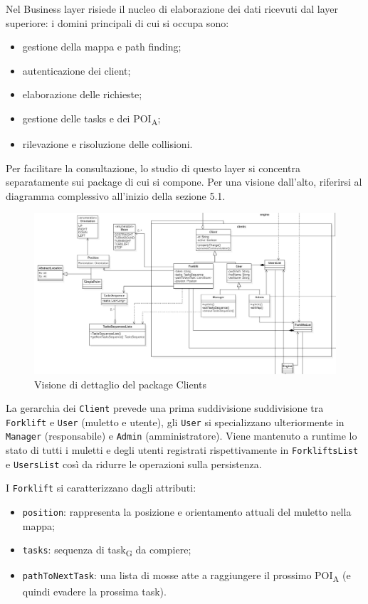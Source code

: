 Nel Business layer risiede il nucleo di elaborazione dei dati ricevuti dal layer superiore: i domini principali di cui si occupa sono:
\begin{itemize}
	\item gestione della mappa e path finding;
	\item autenticazione dei client;
    \item elaborazione delle richieste;
	\item gestione delle tasks e dei POI\textsubscript{A};
	\item rilevazione e risoluzione delle collisioni.
\end{itemize}
Per facilitare la consultazione, lo studio di questo layer si concentra separatamente sui package di cui si compone. Per una visione dall'alto, riferirsi al diagramma complessivo all'inizio della sezione 5.1.



\clearpage
{}

\begin{figure}[H]
	\centering
	\includegraphics[scale=0.40]{res/diagrams/server/server_pack_clients.jpg}
	\caption{Visione di dettaglio del package Clients}
\end{figure}

La gerarchia dei \texttt{Client} prevede una prima suddivisione suddivisione tra \texttt{Forklift} e \texttt{User} (muletto e utente), gli \texttt{User} si specializzano ulteriormente in \texttt{Manager} (responsabile) e \texttt{Admin} (amministratore). Viene mantenuto a runtime lo stato di tutti i muletti e degli utenti registrati rispettivamente in \texttt{ForkliftsList} e \texttt{UsersList} così da ridurre le operazioni sulla persistenza.

I \texttt{Forklift} si caratterizzano dagli attributi:
\begin{itemize}
	\item \texttt{position}: rappresenta la posizione e orientamento attuali del muletto nella mappa;
	\item \texttt{tasks}: sequenza di task\textsubscript{G} da compiere;
	\item \texttt{pathToNextTask}: una lista di mosse atte a raggiungere il prossimo POI\textsubscript{A} (e quindi evadere la prossima task).
\end{itemize}

